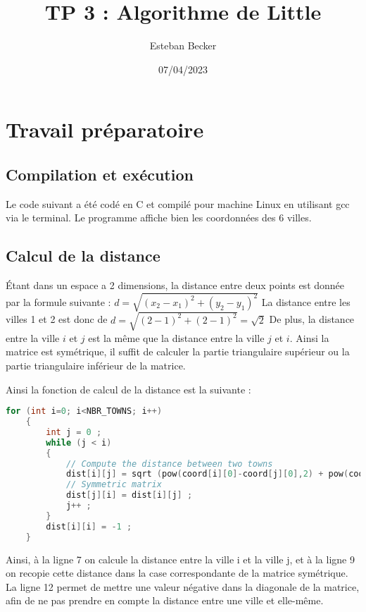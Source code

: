 \documentclass[11pt]{article}
\author{Esteban Becker}
\date{07/04/2023}
\title{TP 3 :  Algorithme de Little}
\begin{document}
\maketitle

\tableofcontents
\newpage

\section{Travail préparatoire}

\subsection{Compilation et exécution}

Le code suivant a été codé en C et compilé pour machine Linux en utilisant gcc via le terminal.
Le programme affiche bien les coordonnées des 6 villes.

\subsection{Calcul de la distance}

Étant dans un espace a 2 dimensions, la distance entre deux points est donnée par la formule suivante : $d = \sqrt{(x_2 - x_1)^2 + (y_2 - y_1)^2}$
La distance entre les villes 1 et 2 est donc de $d = \sqrt{(2 - 1)^2 + (2 - 1)^2} = \sqrt{2}$
De plus, la distance entre la ville $i$ et $j$ est la même que la distance entre la ville $j$ et $i$. Ainsi la matrice est symétrique, il suffit de calculer la partie triangulaire supérieur ou la partie triangulaire inférieur de la matrice.

Ainsi la fonction de calcul de la distance est la suivante :
\begin{lstlisting}[language=C]
for (int i=0; i<NBR_TOWNS; i++)
    {
        int j = 0 ;
        while (j < i)
        {
            // Compute the distance between two towns
            dist[i][j] = sqrt (pow(coord[i][0]-coord[j][0],2) + pow(coord[i][1]-coord[j][1],2)) ;
            // Symmetric matrix
            dist[j][i] = dist[i][j] ;
            j++ ;
        }
        dist[i][i] = -1 ; 
    }
\end{lstlisting}

Ainsi, à la ligne 7 on calcule la distance entre la ville i et la ville j, et à la ligne 9 on recopie cette distance dans la case correspondante de la matrice symétrique.
La ligne 12 permet de mettre une valeur négative dans la diagonale de la matrice, afin de ne pas prendre en compte la distance entre une ville et elle-même.
\end{document}
